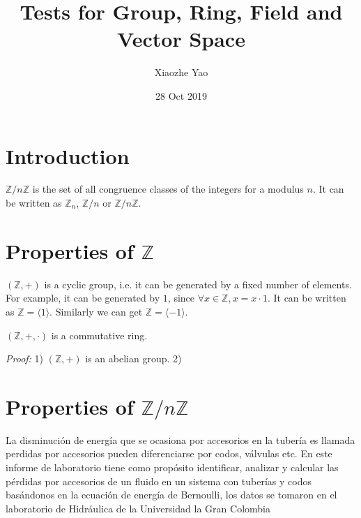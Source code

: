 \documentclass{article}
\title{Tests for Group, Ring, Field and Vector Space}
\author{Xiaozhe Yao}
\date{28 Oct 2019}
\begin{document}
\maketitle
\section{Introduction}
$\mathbb{Z}/n\mathbb{Z}$ is the set of all congruence classes of the integers for a modulus $n$. It can be written as $\mathbb{Z}_n$, $\mathbb{Z}/n$ or $\mathbb{Z}/n\mathbb{Z}$. 

\section{Properties of $\mathbb{Z}$}

$(\mathbb{Z},+)$ is a cyclic group, i.e. it can be generated by a fixed number of elements. For example, it can be generated by $1$, since $\forall x \in \mathbb{Z}, x = x \cdot 1$. It can be written as $\mathbb{Z}=\langle1\rangle$. Similarly we can get $\mathbb{Z}=\langle-1\rangle$.

\noindent$(\mathbb{Z},+,\cdot)$ is a commutative ring.

\textit{Proof:} 1) $(\mathbb{Z},+)$ is an abelian group.
2) 


\section{Properties of $\mathbb{Z}/n\mathbb{Z}$}
La disminución de energía que se ocasiona  por accesorios en la tubería es llamada perdidas por accesorios pueden diferenciarse por codos, válvulas etc. En este informe de laboratorio tiene como propósito identificar, analizar y calcular las pérdidas por accesorios de un fluido en un sistema con tuberías y codos basándonos en la ecuación de energía de Bernoulli, los datos se tomaron en el laboratorio de Hidráulica de la Universidad la Gran Colombia
\end{document}
